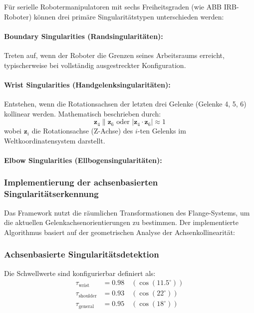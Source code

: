 Für serielle Robotermanipulatoren mit sechs Freiheitsgraden (wie ABB
IRB-Roboter) können drei primäre Singularitätstypen unterschieden werden:

\paragraph{Boundary Singularities (Randsingularitäten):}
Treten auf, wenn der Roboter die Grenzen seines Arbeitsraums erreicht,
typischerweise bei vollständig ausgestreckter Konfiguration.

\paragraph{Wrist Singularities (Handgelenksingularitäten):}
Entstehen, wenn die Rotationsachsen der letzten drei Gelenke (Gelenke 4, 5, 6)
kollinear werden. Mathematisch beschrieben durch:
\begin{equation}
    \mathbf{z}_4 \parallel \mathbf{z}_6 \text{ oder } |\mathbf{z}_4 \cdot \mathbf{z}_6| \approx 1
    \label{eq:wrist_singularity}
\end{equation}
wobei $\mathbf{z}_i$ die Rotationsachse (Z-Achse) des $i$-ten Gelenks im Weltkoordinatensystem darstellt.

\paragraph{Elbow Singularities (Ellbogensingularitäten):}
\subsubsection{Implementierung der achsenbasierten Singularitätserkennung}
\label{sssec:Implementierung_Singularitaeten}

Das Framework nutzt die räumlichen Transformationen des Flange-Systems, um die
aktuellen Gelenkachsenorientierungen zu bestimmen. Der implementierte
Algorithmus basiert auf der geometrischen Analyse der Achsenkollinearität:

\subsubsection{Achsenbasierte Singularitätsdetektion}
\label{alg:singularity_detection}
Die Schwellwerte sind konfigurierbar definiert als:
\begin{align}
    \tau_{\text{wrist}}    & = 0.98 \quad (\cos(11.5^\circ)) \\
    \tau_{\text{shoulder}} & = 0.93 \quad (\cos(22^\circ))   \\
    \tau_{\text{general}}  & = 0.95 \quad (\cos(18^\circ))
\end{align}

